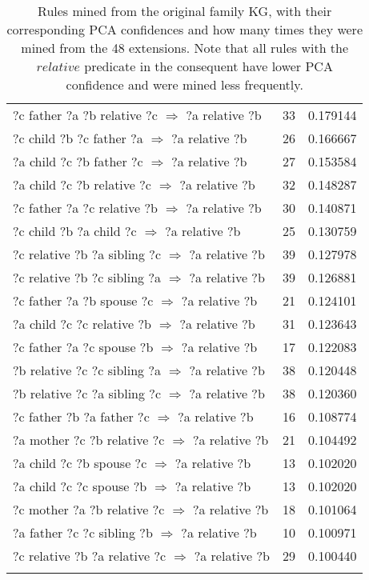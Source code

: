 \begin{longtable}{lrr}
  ?c  father  ?a  ?b  relative  ?c   $\Rightarrow$ ?a  relative  ?b &           33 &        0.179144 \\
     ?c  child  ?b  ?c  father  ?a   $\Rightarrow$ ?a  relative  ?b &           26 &        0.166667 \\
     ?a  child  ?c  ?b  father  ?c   $\Rightarrow$ ?a  relative  ?b &           27 &        0.153584 \\
   ?a  child  ?c  ?b  relative  ?c   $\Rightarrow$ ?a  relative  ?b &           32 &        0.148287 \\
  ?c  father  ?a  ?c  relative  ?b   $\Rightarrow$ ?a  relative  ?b &           30 &        0.140871 \\
      ?c  child  ?b  ?a  child  ?c   $\Rightarrow$ ?a  relative  ?b &           25 &        0.130759 \\
 ?c  relative  ?b  ?a  sibling  ?c   $\Rightarrow$ ?a  relative  ?b &           39 &        0.127978 \\
 ?c  relative  ?b  ?c  sibling  ?a   $\Rightarrow$ ?a  relative  ?b &           39 &        0.126881 \\
    ?c  father  ?a  ?b  spouse  ?c   $\Rightarrow$ ?a  relative  ?b &           21 &        0.124101 \\
   ?a  child  ?c  ?c  relative  ?b   $\Rightarrow$ ?a  relative  ?b &           31 &        0.123643 \\
    ?c  father  ?a  ?c  spouse  ?b   $\Rightarrow$ ?a  relative  ?b &           17 &        0.122083 \\
 ?b  relative  ?c  ?c  sibling  ?a   $\Rightarrow$ ?a  relative  ?b &           38 &        0.120448 \\
 ?b  relative  ?c  ?a  sibling  ?c   $\Rightarrow$ ?a  relative  ?b &           38 &        0.120360 \\
    ?c  father  ?b  ?a  father  ?c   $\Rightarrow$ ?a  relative  ?b &           16 &        0.108774 \\
  ?a  mother  ?c  ?b  relative  ?c   $\Rightarrow$ ?a  relative  ?b &           21 &        0.104492 \\
     ?a  child  ?c  ?b  spouse  ?c   $\Rightarrow$ ?a  relative  ?b &           13 &        0.102020 \\
     ?a  child  ?c  ?c  spouse  ?b   $\Rightarrow$ ?a  relative  ?b &           13 &        0.102020 \\
  ?c  mother  ?a  ?b  relative  ?c   $\Rightarrow$ ?a  relative  ?b &           18 &        0.101064 \\
   ?a  father  ?c  ?c  sibling  ?b   $\Rightarrow$ ?a  relative  ?b &           10 &        0.100971 \\
?c  relative  ?b  ?a  relative  ?c   $\Rightarrow$ ?a  relative  ?b &           29 &        0.100440 \\
\bottomrule
\caption{Rules mined from the original family KG, with their corresponding PCA confidences and how many times they were mined from the 48 extensions. Note that all rules with the $relative$ predicate in the consequent have lower PCA confidence and were mined less frequently.}
\label{family_original_rules_table_PCA}
\end{longtable}